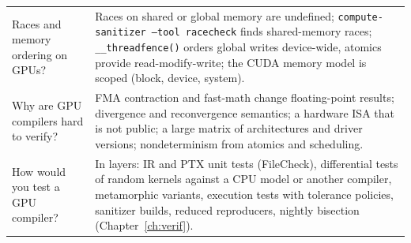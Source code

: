 \documentclass[10pt,a4paper,openany,oneside]{report}
\begin{document}
\begin{center}
\begin{xltabular}{\textwidth}{@{}L{4.6cm}Y@{}}
Races and memory ordering on GPUs? & Races on shared or global memory are undefined; \texttt{compute-sanitizer --tool racecheck} finds shared-memory races; \texttt{\_\_threadfence()} orders global writes device-wide, atomics provide read-modify-write; the CUDA memory model is scoped (block, device, system).\\
Why are GPU compilers hard to verify? & FMA contraction and fast-math change floating-point results; divergence and reconvergence semantics; a hardware ISA that is not public; a large matrix of architectures and driver versions; nondeterminism from atomics and scheduling.\\
How would you test a GPU compiler? & In layers: IR and PTX unit tests (FileCheck), differential tests of random kernels against a CPU model or another compiler, metamorphic variants, execution tests with tolerance policies, sanitizer builds, reduced reproducers, nightly bisection (Chapter~\ref{ch:verif}).\\
\bottomrule
\end{xltabular}
\end{center}
\end{document}
